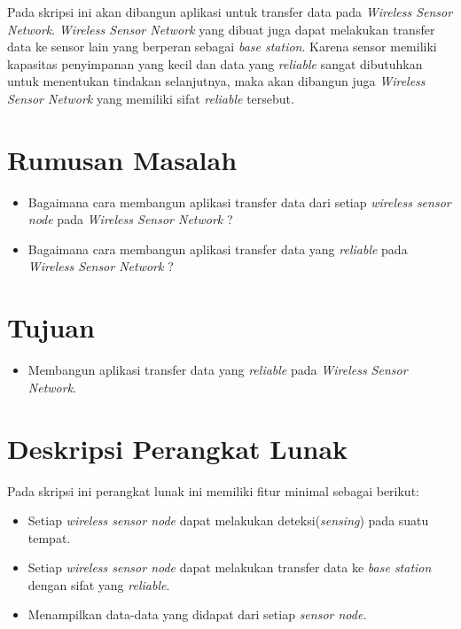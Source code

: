 \documentclass[a4paper,twoside]{article}
\begin{document}
Pada skripsi ini akan dibangun aplikasi untuk transfer data pada {\it Wireless Sensor Network}. {\it Wireless Sensor Network} yang dibuat juga dapat melakukan transfer data ke sensor lain yang berperan sebagai {\it base station}. Karena sensor memiliki kapasitas penyimpanan yang kecil dan data yang {\it reliable} sangat dibutuhkan untuk menentukan tindakan selanjutnya, maka akan dibangun juga {\it Wireless Sensor Network} yang memiliki sifat {\it reliable} tersebut. 

\section{Rumusan Masalah}
\begin{itemize}
	\item Bagaimana cara membangun aplikasi transfer data dari setiap {\it wireless sensor node} pada {\it Wireless Sensor Network} ?
	\item Bagaimana cara membangun aplikasi transfer data yang {\it reliable} pada {\it Wireless Sensor Network} ?
\end{itemize}

\section{Tujuan}
\begin{itemize}
	\item Membangun aplikasi transfer data yang {\it reliable} pada {\it Wireless Sensor Network}.
\end{itemize}

\section{Deskripsi Perangkat Lunak}
Pada skripsi ini perangkat lunak ini memiliki fitur minimal sebagai berikut:
\begin{itemize}
	\item Setiap {\it wireless sensor node} dapat melakukan deteksi({\it sensing}) pada suatu tempat.
	\item Setiap {\it wireless sensor node} dapat melakukan transfer data ke {\it base station} dengan sifat yang {\it reliable}.
	\item Menampilkan data-data yang didapat dari setiap {\it sensor node}. 
\end{itemize}
\end{document}
